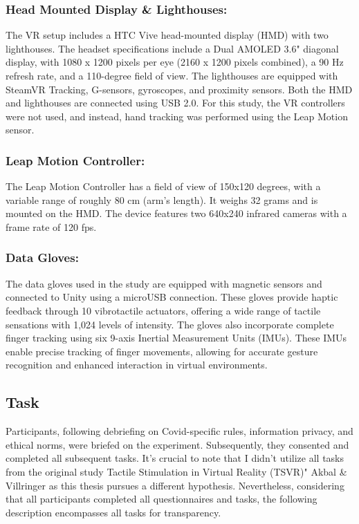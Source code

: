 \documentclass[12pt,oneside,openright]{report}
\begin{document}
\subsubsection*{Head Mounted Display \& Lighthouses:}
The VR setup includes a HTC Vive head-mounted display (HMD) with two lighthouses. The headset specifications include a Dual AMOLED 3.6" diagonal display, with 1080 x 1200 pixels per eye (2160 x 1200 pixels combined), a 90 Hz refresh rate, and a 110-degree field of view. The lighthouses are equipped with SteamVR Tracking, G-sensors, gyroscopes, and proximity sensors. Both the HMD and lighthouses are connected using USB 2.0. For this study, the VR controllers were not used, and instead, hand tracking was performed using the Leap Motion sensor.

\subsubsection*{Leap Motion Controller:}
The Leap Motion Controller has a field of view of 150x120 degrees, with a variable range of roughly 80 cm (arm's length). It weighs 32 grams and is mounted on the HMD. The device features two 640x240 infrared cameras with a frame rate of 120 fps.

\subsubsection*{Data Gloves:}
The data gloves used in the study are equipped with magnetic sensors and connected to Unity using a microUSB connection. These gloves provide haptic feedback through 10 vibrotactile actuators, offering a wide range of tactile sensations with 1,024 levels of intensity. The gloves also incorporate complete finger tracking using six 9-axis Inertial Measurement Units (IMUs). These IMUs enable precise tracking of finger movements, allowing for accurate gesture recognition and enhanced interaction in virtual environments.


\subsection*{Task}

Participants, following debriefing on Covid-specific rules, information privacy, and ethical norms, were briefed on the experiment. Subsequently, they consented and completed all subsequent tasks. It's crucial to note that I didn't utilize all tasks from the original study Tactile Stimulation in Virtual Reality (TSVR)" Akbal \& Villringer as this thesis pursues a different hypothesis. Nevertheless, considering that all participants completed all questionnaires and tasks, the following description encompasses all tasks for transparency.
\end{document}
